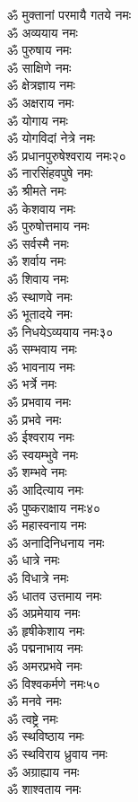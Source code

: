 \begin{center}
\begin{multicols}{2}
\begin{flushleft}
ॐ मुक्तानां परमायै गतये नमः\\
ॐ अव्ययाय नमः\\
ॐ पुरुषाय नमः\\
ॐ साक्षिणे नमः\\
ॐ क्षेत्रज्ञाय नमः\\
ॐ अक्षराय नमः\\
ॐ योगाय नमः\\
ॐ योगविदां नेत्रे नमः\\
ॐ प्रधानपुरुषेश्वराय नमः\hfill २०\\
ॐ नारसिंहवपुषे नमः\\
ॐ श्रीमते नमः\\
ॐ केशवाय नमः\\
ॐ पुरुषोत्तमाय नमः\\
ॐ सर्वस्मै नमः\\
ॐ शर्वाय नमः\\
ॐ शिवाय नमः\\
ॐ स्थाणवे नमः\\
ॐ भूतादये नमः\\
ॐ निधयेऽव्ययाय नमः\hfill ३०\\
ॐ सम्भवाय नमः\\
ॐ भावनाय नमः\\
ॐ भर्त्रे नमः\\
ॐ प्रभवाय नमः\\
ॐ प्रभवे नमः\\
ॐ ईश्वराय नमः\\
ॐ स्वयम्भुवे नमः\\
ॐ शम्भवे नमः\\
ॐ आदित्याय नमः\\
ॐ पुष्कराक्षाय नमः\hfill ४०\\
ॐ महास्वनाय नमः\\
ॐ अनादिनिधनाय नमः\\
ॐ धात्रे नमः\\
ॐ विधात्रे नमः\\
ॐ धातव उत्तमाय नमः\\
ॐ अप्रमेयाय नमः\\
ॐ हृषीकेशाय नमः\\
ॐ पद्मनाभाय नमः\\
ॐ अमरप्रभवे नमः\\
ॐ विश्वकर्मणे नमः\hfill ५०\\
ॐ मनवे नमः\\
ॐ त्वष्ट्रे नमः\\
ॐ स्थविष्ठाय नमः\\
ॐ स्थविराय ध्रुवाय नमः\\
ॐ अग्राह्याय नमः\\
ॐ शाश्वताय नमः\\

\end{flushleft}
\end{multicols}
\end{center}
